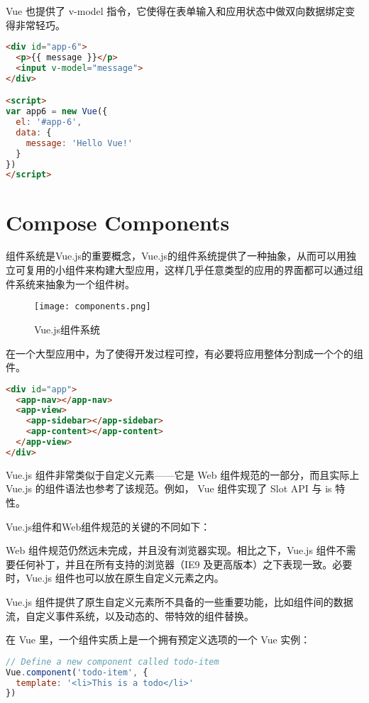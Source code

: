 Vue 也提供了 v-model 指令，它使得在表单输入和应用状态中做双向数据绑定变得非常轻巧。




\begin{lstlisting}[language=HTML]
<div id="app-6">
  <p>{{ message }}</p>
  <input v-model="message">
</div>

<script>
var app6 = new Vue({
  el: '#app-6',
  data: {
    message: 'Hello Vue!'
  }
})
</script>
\end{lstlisting}


\section{Compose Components}


组件系统是Vue.js的重要概念，Vue.js的组件系统提供了一种抽象，从而可以用独立可复用的小组件来构建大型应用，这样几乎任意类型的应用的界面都可以通过组件系统来抽象为一个组件树。


\begin{figure}[htbp]
\centering
\texttt{[image: components.png]}
\caption{Vue.js组件系统}
\end{figure}

在一个大型应用中，为了使得开发过程可控，有必要将应用整体分割成一个个的组件。

\begin{lstlisting}[language=HTML]
<div id="app">
  <app-nav></app-nav>
  <app-view>
    <app-sidebar></app-sidebar>
    <app-content></app-content>
  </app-view>
</div>
\end{lstlisting}


Vue.js 组件非常类似于自定义元素——它是 Web 组件规范的一部分，而且实际上 Vue.js 的组件语法也参考了该规范。例如， Vue 组件实现了 Slot API 与 is 特性。

Vue.js组件和Web组件规范的关键的不同如下：

\begin{compactenum}
\item Web 组件规范仍然远未完成，并且没有浏览器实现。相比之下，Vue.js 组件不需要任何补丁，并且在所有支持的浏览器（IE9 及更高版本）之下表现一致。必要时，Vue.js 组件也可以放在原生自定义元素之内。
\item Vue.js 组件提供了原生自定义元素所不具备的一些重要功能，比如组件间的数据流，自定义事件系统，以及动态的、带特效的组件替换。
\end{compactenum}

在 Vue 里，一个组件实质上是一个拥有预定义选项的一个 Vue 实例：


\begin{lstlisting}[language=JavaScript]
// Define a new component called todo-item
Vue.component('todo-item', {
  template: '<li>This is a todo</li>'
})
\end{lstlisting}

